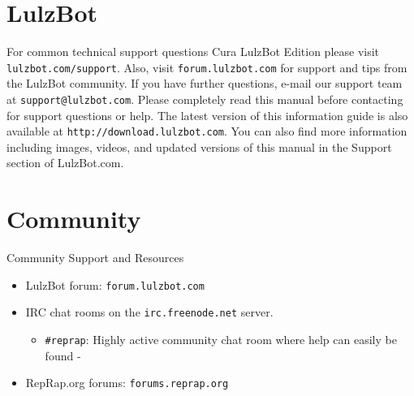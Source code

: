 %
%
%
%
%

\section{LulzBot}
\setlength{\parindent}{0pt}
For common technical support questions Cura LulzBot Edition please visit \texttt{lulzbot.com/support}. Also, visit \texttt{forum.lulzbot.com} for support and tips from the LulzBot community. If you have further questions, e-mail our support team at \texttt{support@lulzbot.com}. Please completely read this manual before contacting for support questions or help. The latest version of this information guide is also available at \texttt{http://download.lulzbot.com}. You can also find more information including images, videos, and updated versions of this manual in the Support section of LulzBot.com.

\section{Community}
Community Support and Resources

\begin{itemize}

\item LulzBot forum: \texttt{forum.lulzbot.com}
\item IRC chat rooms on the \texttt{irc.freenode.net} server.
	\begin{itemize}
	\item \texttt{\#reprap}: Highly active community chat room where help can easily be found
-	\end{itemize}		
\item RepRap.org forums: \texttt{forums.reprap.org}

\end{itemize}

